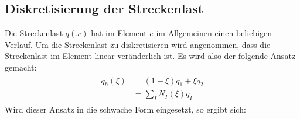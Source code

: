 \documentclass[letterpaper,10pt,german]{jupyterBook}
\begin{document}
\subsection{Diskretisierung der Streckenlast}
\label{\detokenize{chapters/chapter2/BalkenFEM:diskretisierung-der-streckenlast}}
\sphinxAtStartPar
Die Streckenlast \(q(x)\) hat im Element \(e\) im Allgemeinen einen beliebigen Verlauf. Um die Streckenlast zu diskretisieren wird angenommen, dass die Streckenlast im Element linear veränderlich ist. Es wird also der folgende Ansatz gemacht:
\begin{equation}\label{equation:chapters/chapter2/BalkenFEM:AnsatzStreckenlast}
\begin{split}\begin{align}
  q_h(\xi) & = (1-\xi) q_1 + \xi q_2 \\
  & = \sum_I N_I(\xi)  q_I
\end{align}\end{split}
\end{equation}
\sphinxAtStartPar
Wird dieser Ansatz in die schwache Form eingesetzt, so ergibt sich:
\end{document}
